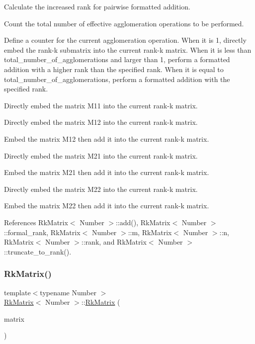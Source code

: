 Calculate the increased rank for pairwise formatted addition.

Count the total number of effective agglomeration operations to be performed.

Define a counter for the current agglomeration operation. When it is 1, directly embed the rank-\/k submatrix into the current rank-\/k matrix. When it is less than {\ttfamily total\+\_\+number\+\_\+of\+\_\+agglomerations} and larger than 1, perform a formatted addition with a higher rank than the specified rank. When it is equal to {\ttfamily total\+\_\+number\+\_\+of\+\_\+agglomerations}, perform a formatted addition with the specified rank.

Directly embed the matrix {\ttfamily M11} into the current rank-\/k matrix.

Directly embed the matrix {\ttfamily M12} into the current rank-\/k matrix.

Embed the matrix {\ttfamily M12} then add it into the current rank-\/k matrix.

Directly embed the matrix {\ttfamily M21} into the current rank-\/k matrix.

Embed the matrix {\ttfamily M21} then add it into the current rank-\/k matrix.

Directly embed the matrix {\ttfamily M22} into the current rank-\/k matrix.

Embed the matrix {\ttfamily M22} then add it into the current rank-\/k matrix.

References Rk\+Matrix$<$ Number $>$\+::add(), Rk\+Matrix$<$ Number $>$\+::formal\+\_\+rank, Rk\+Matrix$<$ Number $>$\+::m, Rk\+Matrix$<$ Number $>$\+::n, Rk\+Matrix$<$ Number $>$\+::rank, and Rk\+Matrix$<$ Number $>$\+::truncate\+\_\+to\+\_\+rank().

\mbox{\label{classRkMatrix_a5f886128ba604cc85f99e3c9c9a07e7c}} 
\subsubsection{\texorpdfstring{Rk\+Matrix()}{RkMatrix()}\hspace{0.1cm}{\footnotesize\ttfamily [19/19]}}
{\footnotesize\ttfamily template$<$typename Number $>$ \\
\hyperlink{classRkMatrix}{Rk\+Matrix}$<$ Number $>$\+::\hyperlink{classRkMatrix}{Rk\+Matrix} (\begin{DoxyParamCaption}\item[{const \hyperlink{classRkMatrix}{Rk\+Matrix}$<$ Number $>$ \&}]{matrix }\end{DoxyParamCaption})}

